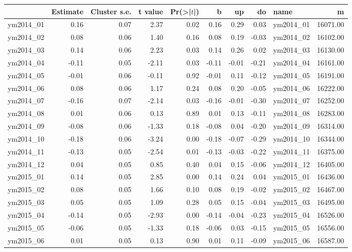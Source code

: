 \begin{table}[ht]
\centering
\begin{tabular}{rrrrrrrrlr}
  \hline
 & Estimate & Cluster s.e. & t value & Pr(>|$t$|) & b & up & do & name & m \\  \hline
ym2014\_01 & 0.16 & 0.07 & 2.37 & 0.02 & 0.16 & 0.29 & 0.03 & ym2014\_01 & 16071.00 \\ 
  ym2014\_02 & 0.08 & 0.06 & 1.40 & 0.16 & 0.08 & 0.19 & -0.03 & ym2014\_02 & 16102.00 \\ 
  ym2014\_03 & 0.14 & 0.06 & 2.23 & 0.03 & 0.14 & 0.26 & 0.02 & ym2014\_03 & 16130.00 \\ 
  ym2014\_04 & -0.11 & 0.05 & -2.11 & 0.03 & -0.11 & -0.01 & -0.21 & ym2014\_04 & 16161.00 \\ 
  ym2014\_05 & -0.01 & 0.06 & -0.11 & 0.92 & -0.01 & 0.11 & -0.12 & ym2014\_05 & 16191.00 \\ 
  ym2014\_06 & 0.08 & 0.06 & 1.17 & 0.24 & 0.08 & 0.20 & -0.05 & ym2014\_06 & 16222.00 \\ 
  ym2014\_07 & -0.16 & 0.07 & -2.14 & 0.03 & -0.16 & -0.01 & -0.30 & ym2014\_07 & 16252.00 \\ 
  ym2014\_08 & 0.01 & 0.06 & 0.13 & 0.89 & 0.01 & 0.13 & -0.11 & ym2014\_08 & 16283.00 \\ 
  ym2014\_09 & -0.08 & 0.06 & -1.33 & 0.18 & -0.08 & 0.04 & -0.20 & ym2014\_09 & 16314.00 \\ 
  ym2014\_10 & -0.18 & 0.06 & -3.24 & 0.00 & -0.18 & -0.07 & -0.29 & ym2014\_10 & 16344.00 \\ 
  ym2014\_11 & -0.13 & 0.05 & -2.54 & 0.01 & -0.13 & -0.03 & -0.22 & ym2014\_11 & 16375.00 \\ 
  ym2014\_12 & 0.04 & 0.05 & 0.85 & 0.40 & 0.04 & 0.15 & -0.06 & ym2014\_12 & 16405.00 \\ 
  ym2015\_01 & 0.14 & 0.05 & 2.85 & 0.00 & 0.14 & 0.24 & 0.04 & ym2015\_01 & 16436.00 \\ 
  ym2015\_02 & 0.08 & 0.05 & 1.66 & 0.10 & 0.08 & 0.19 & -0.02 & ym2015\_02 & 16467.00 \\ 
  ym2015\_03 & 0.05 & 0.05 & 1.09 & 0.28 & 0.05 & 0.15 & -0.04 & ym2015\_03 & 16495.00 \\ 
  ym2015\_04 & -0.14 & 0.05 & -2.93 & 0.00 & -0.14 & -0.04 & -0.23 & ym2015\_04 & 16526.00 \\ 
  ym2015\_05 & -0.06 & 0.05 & -1.33 & 0.18 & -0.06 & 0.03 & -0.15 & ym2015\_05 & 16556.00 \\ 
  ym2015\_06 & 0.01 & 0.05 & 0.13 & 0.90 & 0.01 & 0.11 & -0.09 & ym2015\_06 & 16587.00 \\ 

\end{tabular}
\end{table}
